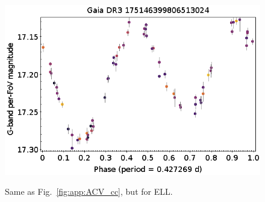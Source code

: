 \documentclass[longauth]{aa}
\begin{document}
\begin{appendix}
\begin{figure}
\hspace{2mm}
 \includegraphics[width=0.45\hsize]{figures/appendix/Compact_Companion-38.png} \\
\vspace{4mm}
 \caption{Same as Fig.~\ref{fig:app:ACV_cc}, but for ELL.}
 \label{fig:app:ELL_cc}
\end{figure}




\end{appendix}
\end{document}
